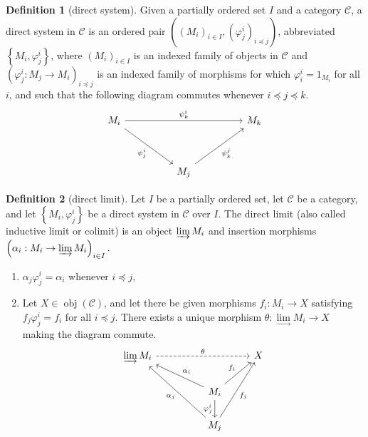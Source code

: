 \documentclass[a4paper,12pt]{article}
\theoremstyle{definition}
\newtheorem{defn}{Definition}[subsection]
\begin{document}
\begin{defn}[direct system]
    Given a partially ordered set $I$ and a category $\mathcal{C}$, a direct system in $\mathcal{C}$ is an ordered pair $\left(\left(M_i\right)_{i \in I},\left(\varphi_j^i\right)_{i \preceq j}\right)$, abbreviated $\left\{M_i, \varphi_j^i\right\}$, where $\left(M_i\right)_{i \in I}$ is an indexed family of objects in $\mathcal{C}$ and $\left(\varphi_j^i: M_j \rightarrow M_i\right)_{i \preceq j}$ is an indexed family of morphisms for which $\varphi_i^i=1_{M_i}$ for all $i$, and such that the following diagram commutes whenever $i \preceq j \preceq k$.
    \[\begin{tikzcd}
            {M_i} &&&& {M_k} \\
            \\
            && {M_j}
            \arrow["{\psi^{i}_{k}}", from=1-1, to=1-5]
            \arrow["{\psi^{i}_{j}}"', from=1-1, to=3-3]
            \arrow["{\psi^{j}_{k}}"', from=3-3, to=1-5]
        \end{tikzcd}\]
\end{defn}
\begin{defn}[direct limit]
    Let $I$ be a partially ordered set, let $\mathcal{C}$ be a category, and let $\left\{M_i, \varphi_j^i\right\}$ be a direct system in $\mathcal{C}$ over $I$. The direct limit (also called inductive limit or colimit) is an object $\varinjlim M_i$ and insertion morphisms $\left(\alpha_i: M_i \rightarrow \varinjlim M_i \right)_{i\in I}.$
    \begin{enumerate}[(1)]
        \item  $\alpha_j \varphi_j^i=\alpha_i$ whenever $i \preceq j$,
        \item  Let $X \in \operatorname{obj}(\mathcal{C})$, and let there be given morphisms $f_i: M_i \rightarrow X$ satisfying $f_j \varphi_j^i=f_i$ for all $i \preceq j$. There exists a unique morphism $\theta: \underset{\longrightarrow}{\lim } M_i \rightarrow X$ making the diagram commute.
              \[\begin{tikzcd}
                      {\varinjlim M_i} &&& X \\
                      && { M_i} \\
                      && {M_j}
                      \arrow["\theta", dashed, from=1-1, to=1-4]
                      \arrow["{f_i}", from=2-3, to=1-4]
                      \arrow["{\varphi^{i}_{j}}"', from=2-3, to=3-3]
                      \arrow["{f_j}"', from=3-3, to=1-4]
                      \arrow["{\alpha_i}"', from=2-3, to=1-1]
                      \arrow["{\alpha_j}", from=3-3, to=1-1]
                  \end{tikzcd}\]
    \end{enumerate}
\end{defn}
\end{document}
